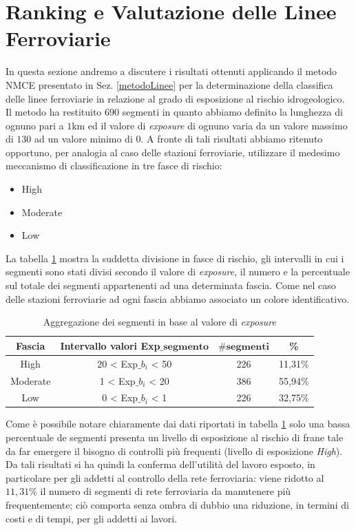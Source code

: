 \section{Ranking e Valutazione delle Linee Ferroviarie}
In questa sezione andremo a discutere i risultati ottenuti applicando il metodo NMCE presentato in Sez. \ref{metodoLinee} per la determinazione della classifica delle linee ferroviarie in relazione al grado di esposizione al rischio idrogeologico.\newline \newline
Il metodo ha restituito $690$ segmenti in quanto abbiamo definito la lunghezza di ognuno pari a $1$km ed il valore di \textit{exposure} di ognuno varia da un valore massimo di $130$ ad un valore minimo di $0$. A fronte di tali risultati abbiamo ritenuto opportuno, per analogia al caso delle stazioni ferroviarie, utilizzare il medesimo meccanismo di classificazione in tre fasce di rischio:
\begin{itemize}
	\item High
	\item Moderate
	\item Low
\end{itemize}
La tabella \ref{rangeLinee} mostra la suddetta divisione in fasce di rischio, gli intervalli in cui i segmenti sono stati divisi secondo il valore di \textit{exposure}, il numero e la percentuale sul totale dei segmenti appartenenti ad una determinata fascia. Come nel caso delle stazioni ferroviarie ad ogni fascia abbiamo associato un colore identificativo.
\begin{table}[h]
\centering
\begin{tabular}{|c|c|c|c|}
\hline
\rowcolor{lightgray}
\textbf{Fascia} & \textbf{Intervallo valori Exp$\mathbf{\_}$$\mathbf{segmento}$} & $\mathbf{\#segmenti}$ & \textbf{\%} \\
\hline
\rowcolor{flamingopink}
High & 20 < Exp$\_$$b_i$ < 50 & 226 & 11,31\%\\
\hline
\rowcolor{icterine}
Moderate & 1 < Exp$\_$$b_i$ < 20 & 386 & 55,94\%\\
\hline
\rowcolor{inchworm}
Low & $0$ < Exp$\_$$b_i$ < 1 & 226 & 32,75\%\\
\hline
\end{tabular}
\caption{Aggregazione dei segmenti in base al valore di \textit{exposure} }
\label{rangeLinee}
\end{table}
Come è possibile notare chiaramente dai dati riportati in tabella \ref{rangeLinee} solo una bassa percentuale de segmenti presenta un livello di esposizione al rischio di frane tale da far emergere il bisogno di controlli più frequenti (livello di esposizione \textit{High}). Da tali risultati si ha quindi la conferma dell'utilità del lavoro esposto, in particolare per gli addetti al controllo della rete ferroviaria: viene ridotto al $11,31\%$ il numero di segmenti di rete ferroviaria da manutenere più frequentemente; ciò comporta senza ombra di dubbio una riduzione, in termini di costi e di tempi, per gli addetti ai lavori.
